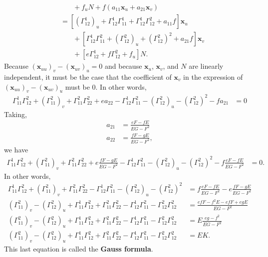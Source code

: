 \documentclass[10pt]{article}
\newcommand{\ve}[1]{\mathbf{#1}}
\begin{document}
\begin{itemize}
\begin{align*}
      &\phantom{\ =\ }+ f_u N + f (a_{11} \ve{x}_u + a_{21} \ve{x}_v)\\      
      &= [(\Gamma_{12}^1)_u + \Gamma_{12}^1 \Gamma_{11}^1 + \Gamma_{12}^1 \Gamma_{12}^2 + a_{11} f] \ve{x}_u\\
      &\phantom{\ =\ } + [\Gamma_{12}^1 \Gamma_{11}^2 + (\Gamma_{12}^2)_u + (\Gamma_{12}^2)^2 + a_{21} f] \ve{x}_v\\
      &\phantom{\ =\ } + [e \Gamma_{12}^1 + f\Gamma_{12}^2 + f_u]N.
    \end{align*}
    Because $(\ve{x}_{uu})_v - (\ve{x}_{uv})_u = 0$ and because $\ve{x}_u$, $\ve{x}_v$, and $N$ are linearly independent, it must be the case that the coefficient of $\ve{x}_v$ in the expression of $(\ve{x}_{uu})_v - (\ve{x}_{uv})_u$ must be 0. In other words,
    \begin{align*}
      \Gamma_{11}^1 \Gamma_{12}^2 + (\Gamma_{11}^2)_v + \Gamma_{11}^2 \Gamma_{22}^2 + e a_{22} - \Gamma_{12}^1 \Gamma_{11}^2 - (\Gamma_{12}^2)_u - (\Gamma_{12}^2)^2 - f a_{21}
      &= 0
    \end{align*}
    Taking,
    \begin{align*}
      a_{21} &= \frac{eF - fE}{EG-F^2}\\
      a_{22} &= \frac{fF - gE}{EG-F^2},
    \end{align*}
    we have
    \begin{align*}
      \Gamma_{11}^1 \Gamma_{12}^2 + (\Gamma_{11}^2)_v + \Gamma_{11}^2 \Gamma_{22}^2 + e \frac{fF - gE}{EG-F^2} - \Gamma_{12}^1 \Gamma_{11}^2 - (\Gamma_{12}^2)_u - (\Gamma_{12}^2)^2 - f\frac{eF - fE}{EG-F^2}
      &= 0.
    \end{align*}
    In other words,
    \begin{align*}
      \Gamma_{11}^1 \Gamma_{12}^2 + (\Gamma_{11}^2)_v + \Gamma_{11}^2 \Gamma_{22}^2 - \Gamma_{12}^1 \Gamma_{11}^2 - (\Gamma_{12}^2)_u - (\Gamma_{12}^2)^2 
      &= f\frac{eF - fE}{EG-F^2} - e \frac{fF - gE}{EG-F^2}\\
      (\Gamma_{11}^2)_v -  (\Gamma_{12}^2)_u + \Gamma_{11}^1 \Gamma_{12}^2 + \Gamma_{11}^2 \Gamma_{22}^2 - \Gamma_{12}^1 \Gamma_{11}^2 - \Gamma_{12}^2 \Gamma_{12}^2
      &=\frac{efF - f^2E - ef F + eg E}{EG-F^2}\\
      (\Gamma_{11}^2)_v -  (\Gamma_{12}^2)_u + \Gamma_{11}^1 \Gamma_{12}^2 + \Gamma_{11}^2 \Gamma_{22}^2 - \Gamma_{12}^1 \Gamma_{11}^2 - \Gamma_{12}^2 \Gamma_{12}^2
      &= E \frac{eg -  f^2}{EG-F^2}\\
      (\Gamma_{11}^2)_v -  (\Gamma_{12}^2)_u + \Gamma_{11}^1 \Gamma_{12}^2 + \Gamma_{11}^2 \Gamma_{22}^2 - \Gamma_{12}^1 \Gamma_{11}^2 - \Gamma_{12}^2 \Gamma_{12}^2
      &= EK.
    \end{align*}
    This last equation is called the {\bf Gauss formula}.


\end{itemize}
\end{document}
